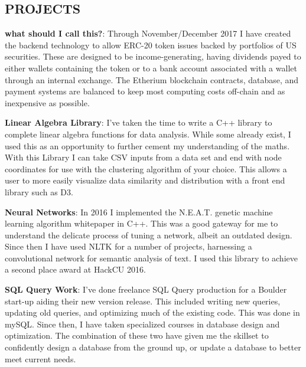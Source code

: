 \documentclass[margin]{res}
\begin{document}
\begin{resume}
\section{PROJECTS}
\par
\textbf{what should I call this?}:
Through November/December 2017 I have created the backend technology to allow ERC-20 token issues backed by portfolios of US securities. These are designed to be income-generating, having dividends payed to either wallets containing the token or to a bank account associated with a wallet through an internal exchange. The Etherium blockchain contracts, database, and payment systems are balanced to keep most computing costs off-chain and as inexpensive as possible.
\par
\textbf{Linear Algebra Library}:
I've taken the time to write a C++ library to complete linear algebra functions for data analysis. While some already exist, I used this as an opportunity to further cement my understanding of the maths. With this Library I can take CSV inputs from a data set and end with node coordinates for use with the clustering algorithm of your choice. This allows a user to more easily visualize data similarity and distribution with a front end library such as D3. 
\par
\textbf{Neural Networks}: 
In 2016 I implemented the N.E.A.T. genetic machine learning algorithm whitepaper in C++. This was a good gateway for me to understand the delicate process of tuning a network, albeit an outdated design. Since then I have used NLTK for a number of projects, harnessing a convolutional network for semantic analysis of text. I used this library to achieve a second place award at HackCU 2016.
\par
\textbf{SQL Query Work}: 
I've done freelance SQL Query production for a Boulder start-up aiding their new version release. This included writing new queries, updating old queries, and optimizing much of the existing code. This was done in mySQL. Since then, I have taken specialized courses in database design and optimization. The combination of these two have given me the skillset to confidently design a database from the ground up, or update a database to better meet current needs.



\end{resume}
\end{document}
